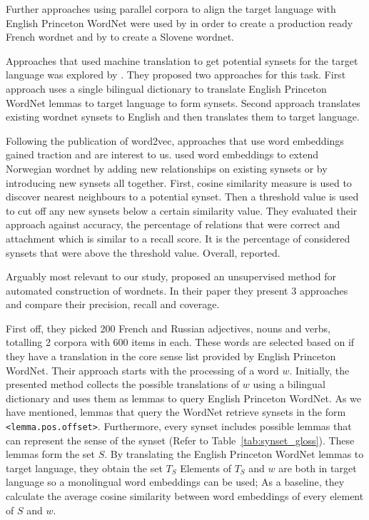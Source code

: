 Further approaches using parallel corpora to align the target language with English Princeton WordNet were used by \textcite{sagot_building_2008} in order to create a production ready French wordnet and by \textcite{fiser_leveraging_2009} to create a Slovene wordnet.

Approaches that used machine translation to get potential synsets for the target language was explored by \textcite{lam_automatically_2014}.
They proposed two approaches for this task.
First approach uses a single bilingual dictionary to translate English Princeton WordNet lemmas to target language to form synsets.
Second approach translates existing wordnet synsets to English and then translates them to target language.

Following the publication of word2vec, approaches that use word embeddings gained traction and are interest to us.
\textcite{sand_wordnet_2017} used word embeddings to extend Norwegian wordnet by adding new relationships on existing synsets or by introducing new synsets all together.
First, cosine similarity measure is used to discover nearest neighbours to a potential synset.
Then a threshold value is used to cut off any new synsets below a certain similarity value.
They evaluated their approach against accuracy, the percentage of relations that were correct and attachment which is similar to a recall score.
It is the percentage of considered synsets that were above the threshold value.
Overall, \citeauthor{sand_wordnet_2017} reported.

Arguably most relevant to our study, \textcite{khodak_automated_2017} proposed an unsupervised method for automated construction of wordnets.
In their paper  they present 3 approaches and compare their precision, recall and coverage.

First off, they picked 200 French and Russian adjectives, nouns and verbs, totalling 2 corpora with 600 items in each.
These words are selected based on if they have a translation in the core sense list provided by English Princeton WordNet.
Their approach starts with the processing of a word $w$.
Initially, the presented method collects the possible translations of $w$ using a bilingual dictionary and uses them as lemmas to query English Princeton WordNet.
As we have mentioned, lemmas that query the WordNet retrieve synsets in the form \texttt{<lemma.pos.offset>}.
Furthermore, every synset includes possible lemmas that can represent the sense of the synset (Refer to Table~\ref{tab:synset_gloss}).
These lemmas form the set $S$.
By translating the English Princeton WordNet lemmas to target language, they obtain the set $T_S$
Elements of $T_S$ and $w$ are both in target language so a monolingual word embeddings can be used;
As a baseline, they calculate the average cosine similarity between word embeddings of every element of $S$ and $w$.

